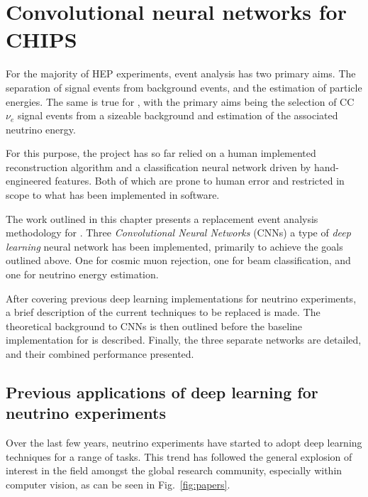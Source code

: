 \chapter{Convolutional neural networks for CHIPS} %
\label{chap:cvn} %

For the majority of HEP experiments, event analysis has two primary aims. The separation of signal
events from background events, and the estimation of particle energies. The same is true for
\chips, with the primary aims being the selection of CC $\nu_{e}$ signal events from a sizeable
background and estimation of the associated neutrino energy.

For this purpose, the \chips project has so far relied on a human implemented reconstruction
algorithm and a classification neural network driven by hand-engineered features. Both of which
are prone to human error and restricted in scope to what has been implemented in software.

The work outlined in this chapter presents a replacement event analysis methodology for \chips.
Three \emph{Convolutional Neural Networks} (CNNs) a type of \emph{deep learning} neural network
has been implemented, primarily to achieve the goals outlined above. One for cosmic muon
rejection, one for beam classification, and one for neutrino energy estimation.

After covering previous deep learning implementations for neutrino experiments, a brief
description of the current techniques to be replaced is made. The theoretical background to CNNs
is then outlined before the baseline implementation for \chips is described. Finally, the three
separate networks are detailed, and their combined performance presented.

\section{Previous applications of deep learning for neutrino experiments} %
\label{sec:cvn_previous} %

Over the last few years, neutrino experiments have started to adopt deep learning techniques for a
range of tasks. This trend has followed the general explosion of interest in the field amongst the
global research community, especially within computer vision, as can be seen in
Fig.~\ref{fig:papers}.

